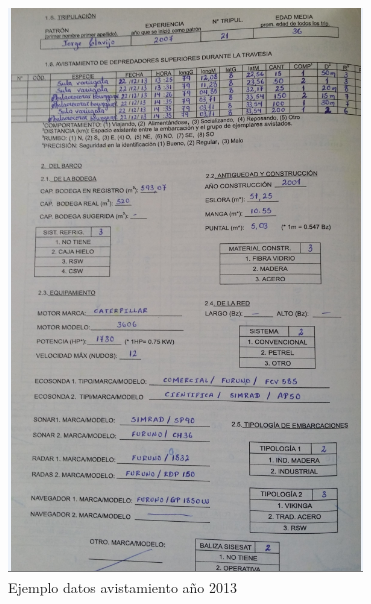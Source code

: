 \documentclass[a4paper,oneside,11pt]{book}
\begin{document}
\begin{figure}
\centering
\includegraphics[width=0.8\linewidth]{imagen_Manual_PBP/nueva1}
\caption{Ejemplo datos avistamiento año 2013}
\label{fig:inter}
\end{figure}
 
\end{document}
